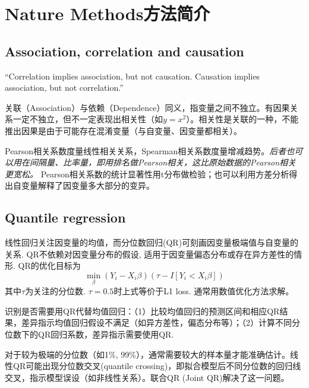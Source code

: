 
\chapter{Nature Methods方法简介}

\section{Association, correlation and causation}
\par ``Correlation implies association, but not causation. Causation implies association, but not
correlation.''
\par 关联（Association）与依赖（Dependence）同义，指变量之间不独立。有因果关系一定不独立，但不一定表现出相关性（如$y=x^2$）。相关性是关联的一种，不能推出因果是由于可能存在混淆变量（与自变量、因变量都相关）。
\par Pearson相关系数度量线性相关关系，Spearman相关系数度量增减趋势。\emph{后者也可以用在间隔量、比率量，即用排名做Pearson相关，这比原始数据的Pearson相关更宽松。} Pearson相关系数的统计显著性用t分布做检验；也可以利用方差分析得出自变量解释了因变量多大部分的变异。


\section{Quantile regression}

\par 线性回归关注因变量的均值，而分位数回归(QR)可刻画因变量极端值与自变量的关系. QR不依赖对因变量分布的假设, 适用于因变量偏态分布或存在异方差性的情形. QR的优化目标为
\begin{equation}
    \min\limits_\beta (Y_i-X_i\beta)(\tau-I[Y_i<X_i\beta])
\end{equation}
其中$\tau$为关注的分位数. $\tau=0.5$时上式等价于L1 loss. 通常用数值优化方法求解。

\par 识别是否需要用QR代替均值回归：（1）比较均值回归的预测区间和相应QR结果，差异指示均值回归假设不满足（如异方差性，偏态分布等）；（2）计算不同分位数下的QR回归系数，差异指示需要使用QR. 

\par 对于较为极端的分位数（如1\%, 99\%），通常需要较大的样本量才能准确估计。线性QR可能出现分位数交叉(quantile crossing)，即拟合模型后不同分位数的回归线交叉，指示模型误设（如非线性关系）。联合QR (Joint QR)解决了这一问题。

